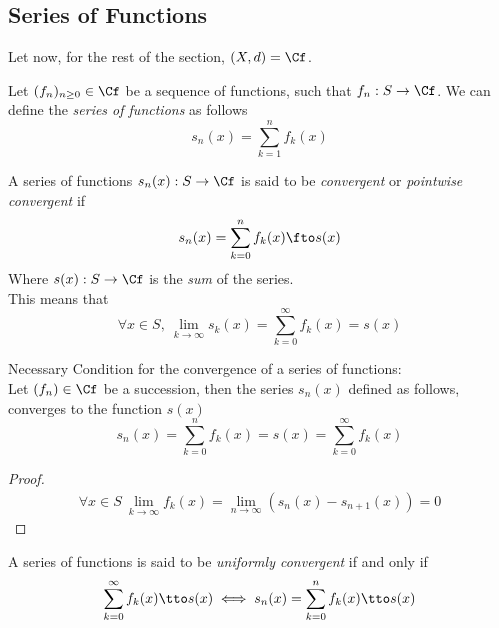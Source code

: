 \documentclass[../mmf.tex]{subfiles}
\begin{document}
\subsection{Series of Functions}
Let now, for the rest of the section, $(X,d)=\Cf$.
\begin{dfn}
	Let $(f_n)_{n\ge0}\in\Cf$ be a sequence of functions, such that $f_n:S\to\Cf$. We can define the \textit{series of functions} as follows
	\begin{equation}
		s_n(x)=\sum_{k=1}^nf_k(x)
		\label{eq:seriesdef}
	\end{equation}
\end{dfn}
\begin{dfn}
	A series of functions $s_n(x):S\to\Cf$ is said to be \textit{convergent} or \textit{pointwise convergent} if
	\begin{equation}
		s_n(x)=\sum_{k=0}^nf_k(x)\fto s(x)
		\label{eq:serconv}
	\end{equation}
	Where $s(x):S\to\Cf$ is the \textit{sum} of the series.\\
	This means that
	\begin{equation}
		\forall x\in S,\ \lim_{k\to\infty}s_k(x)=\sum_{k=0}^\infty f_k(x)=s(x)
	\end{equation}
\end{dfn}
\begin{thm}
	Necessary Condition for the convergence of a series of functions:\\
	Let $(f_n)\in\Cf$ be a succession, then the series $s_n(x)$ defined as follows, converges to the function $s(x)$
	\begin{equation*}
		s_n(x)=\sum_{k=0}^nf_k(x)=s(x)=\sum_{k=0}^\infty f_k(x)
	\end{equation*}
\end{thm}
\begin{proof}
	\begin{equation*}
		\begin{aligned}
			\forall x\in S\ \lim_{k\to\infty}f_k(x)=\lim_{n\to\infty}\left( s_n(x)-s_{n+1}(x) \right)=0
		\end{aligned}
	\end{equation*}
\end{proof}
\begin{dfn}
	A series of functions is said to be \textit{uniformly convergent} if and only if
	\begin{equation}
		\sum_{k=0}^\infty f_k(x)\tto s(x)\iff s_n(x)=\sum_{k=0}^nf_k(x)\tto s(x)
		\label{eq:uniformconvser}
	\end{equation}
\end{dfn}
\end{document}
